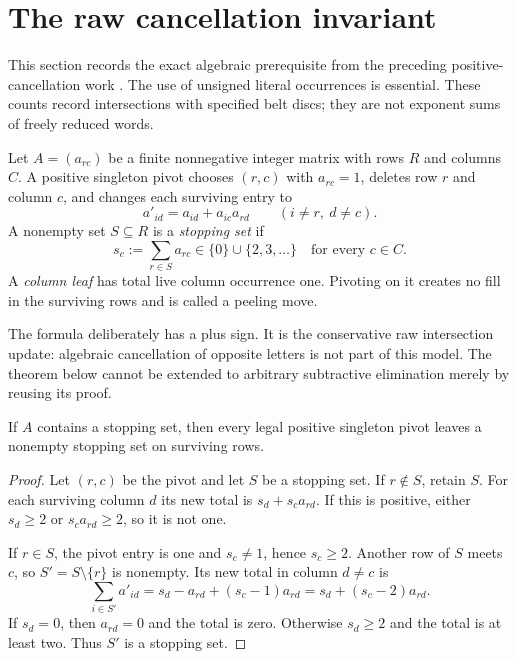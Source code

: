 \section{The raw cancellation invariant}
\label{sec:raw}

This section records the exact algebraic prerequisite from the preceding
positive-cancellation work \cite{IncomingPositive}.  The use of unsigned
literal occurrences is essential.  These counts record intersections with
specified belt discs; they are not exponent sums of freely reduced words.

\begin{definition}
Let $A=(a_{rc})$ be a finite nonnegative integer matrix with rows $R$ and
columns $C$.  A positive singleton pivot chooses $(r,c)$ with $a_{rc}=1$,
deletes row $r$ and column $c$, and changes each surviving entry to
\[
 a'_{id}=a_{id}+a_{ic}a_{rd}\qquad(i\ne r,\ d\ne c).
\]
A nonempty set $S\subseteq R$ is a \emph{stopping set} if
\[
 s_c:=\sum_{r\in S}a_{rc}\in\{0\}\cup\{2,3,\ldots\}
 \quad\text{for every }c\in C.
\]
A \emph{column leaf} has total live column occurrence one.  Pivoting on
it creates no fill in the surviving rows and is called a peeling move.
\end{definition}

The formula deliberately has a plus sign.  It is the conservative raw
intersection update: algebraic cancellation of opposite letters is not
part of this model.  The theorem below cannot be extended to arbitrary
subtractive elimination merely by reusing its proof.

\begin{lemma}
\label{lem:stopping-invariant}
If $A$ contains a stopping set, then every legal positive singleton pivot
leaves a nonempty stopping set on surviving rows.
\end{lemma}
\begin{proof}
Let $(r,c)$ be the pivot and let $S$ be a stopping set.  If $r\notin S$,
retain $S$.  For each surviving column $d$ its new total is
$s_d+s_c a_{rd}$.  If this is positive, either $s_d\ge2$ or
$s_c a_{rd}\ge2$, so it is not one.

If $r\in S$, the pivot entry is one and $s_c\ne1$, hence $s_c\ge2$.
Another row of $S$ meets $c$, so $S'=S\setminus\{r\}$ is nonempty.  Its
new total in column $d\ne c$ is
\[
 \sum_{i\in S'}a'_{id}
 =s_d-a_{rd}+(s_c-1)a_{rd}
 =s_d+(s_c-2)a_{rd}.
\]
If $s_d=0$, then $a_{rd}=0$ and the total is zero.  Otherwise $s_d\ge2$
and the total is at least two.  Thus $S'$ is a stopping set.
\end{proof}

